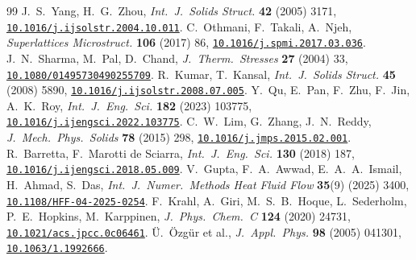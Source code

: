 \documentclass[11pt]{article}
\newcommand{\doi}[1]{\href{https://doi.org/#1}{\texttt{#1}}}
\begin{document}
\begin{thebibliography}{99}
\small
{} J.~S.~Yang, H.~G.~Zhou, \emph{Int.\ J.\ Solids Struct.} \textbf{42} (2005) 3171, \doi{10.1016/j.ijsolstr.2004.10.011}.
 C.~Othmani, F.~Takali, A.~Njeh, \emph{Superlattices Microstruct.} \textbf{106} (2017) 86, \doi{10.1016/j.spmi.2017.03.036}.
 J.~N.~Sharma, M.~Pal, D.~Chand, \emph{J.\ Therm.\ Stresses} \textbf{27} (2004) 33, \doi{10.1080/01495730490255709}.
 R.~Kumar, T.~Kansal, \emph{Int.\ J.\ Solids Struct.} \textbf{45} (2008) 5890, \doi{10.1016/j.ijsolstr.2008.07.005}.
 Y.~Qu, E.~Pan, F.~Zhu, F.~Jin, A.~K.~Roy, \emph{Int.\ J.\ Eng.\ Sci.} \textbf{182} (2023) 103775, \doi{10.1016/j.ijengsci.2022.103775}.
 C.~W.~Lim, G.~Zhang, J.~N.~Reddy, \emph{J.\ Mech.\ Phys.\ Solids} \textbf{78} (2015) 298, \doi{10.1016/j.jmps.2015.02.001}.
 R.~Barretta, F.~Marotti de Sciarra, \emph{Int.\ J.\ Eng.\ Sci.} \textbf{130} (2018) 187, \doi{10.1016/j.ijengsci.2018.05.009}.
 V.~Gupta, F.~A.~Awwad, E.~A.~A.~Ismail, H.~Ahmad, S.~Das, \emph{Int.\ J.\ Numer.\ Methods Heat Fluid Flow} \textbf{35}(9) (2025) 3400, \doi{10.1108/HFF-04-2025-0254}.
 F.~Krahl, A.~Giri, M.~S.~B.~Hoque, L.~Sederholm, P.~E.~Hopkins, M.~Karppinen, \emph{J.\ Phys.\ Chem.\ C} \textbf{124} (2020) 24731, \doi{10.1021/acs.jpcc.0c06461}.
 \"U.~\"Ozg\"ur et al., \emph{J.\ Appl.\ Phys.} \textbf{98} (2005) 041301, \doi{10.1063/1.1992666}.
\end{thebibliography}
\end{document}

